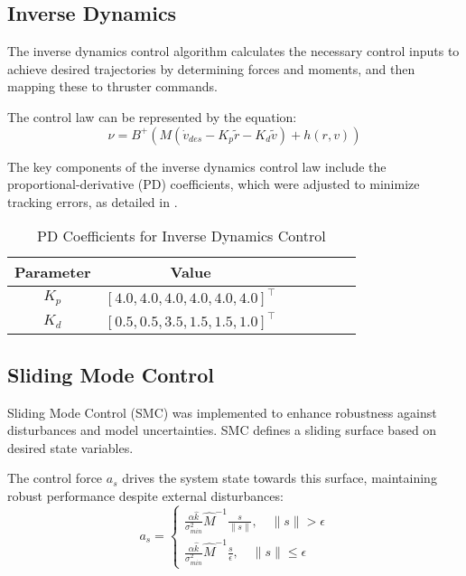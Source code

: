     \subsection{Inverse Dynamics}
    
    The inverse dynamics control algorithm calculates the necessary control inputs to achieve desired trajectories by determining forces and moments, and then mapping these to thruster commands.

    The control law can be represented by the equation:
    \begin{equation*}
        \nu = B^{+} (M(\dot{v}_{des} - K_p \tilde{r} - K_d \tilde{v}) + h(r, v))
    \end{equation*}

    The key components of the inverse dynamics control law include the proportional-derivative (PD) coefficients, which were adjusted to minimize tracking errors, as detailed in .
    
    \begin{table}[H]
        \captionsetup{justification=centering}
        \caption{PD Coefficients for Inverse Dynamics Control}
        \begin{center}
        \begin{tabular}{|c|c|c|c|c|c|c|}
        \hline
        \textbf{Parameter} & \textbf{Value} \\ \hline
        $K_p$ & $[4.0, 4.0, 4.0, 4.0, 4.0, 4.0]^\top$ \\
        $K_d$ & $[0.5, 0.5, 3.5, 1.5, 1.5, 1.0]^\top$\\ \hline
        \end{tabular}
        \end{center}
        \label{table:pid_coefs}
    \end{table}
    
    \subsection{Sliding Mode Control}
    
    Sliding Mode Control (SMC) was implemented to enhance robustness against disturbances and model uncertainties. SMC defines a sliding surface based on desired state variables.
    
    The control force $a_s$ drives the system state towards this surface, maintaining robust performance despite external disturbances:
    \begin{equation*} 
        a_s = 
        \begin{cases}
            \frac{\alpha \hat{k}}{\sigma_{min}^2}\hat{M}^{-1} \frac{s}{\|s\|}, \quad \|s\| >\epsilon\\
            \frac{\alpha \hat{k}}{\sigma_{min}^2}\hat{M}^{-1} \frac{s}{\epsilon}, \quad \|s\| \leq\epsilon
        \end{cases}
    \end{equation*}
    
